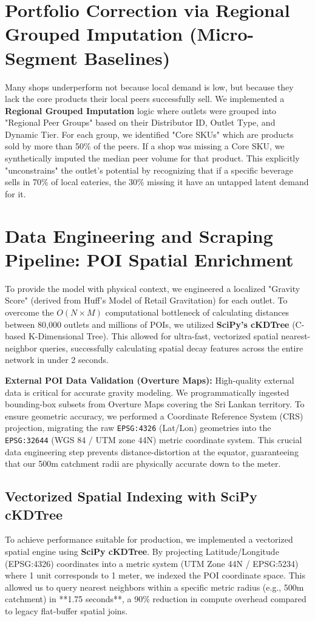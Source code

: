 \documentclass[10pt,a4paper]{article}
\begin{document}
\section{Portfolio Correction via Regional Grouped Imputation (Micro-Segment Baselines)}
Many shops underperform not because local demand is low, but because they lack the core products their local peers successfully sell. We implemented a \textbf{Regional Grouped Imputation} logic where outlets were grouped into "Regional Peer Groups" based on their Distributor ID, Outlet Type, and Dynamic Tier. For each group, we identified "Core SKUs" which are products sold by more than 50\% of the peers. If a shop was missing a Core SKU, we synthetically imputed the median peer volume for that product. This explicitly "unconstrains" the outlet's potential by recognizing that if a specific beverage sells in 70\% of local eateries, the 30\% missing it have an untapped latent demand for it.

\section{Data Engineering and Scraping Pipeline: POI Spatial Enrichment}
To provide the model with physical context, we engineered a localized "Gravity Score" (derived from Huff's Model of Retail Gravitation) for each outlet. To overcome the $O(N \times M)$ computational bottleneck of calculating distances between 80,000 outlets and millions of POIs, we utilized \textbf{SciPy's cKDTree} (C-based K-Dimensional Tree). This allowed for ultra-fast, vectorized spatial nearest-neighbor queries, successfully calculating spatial decay features across the entire network in under 2 seconds.

\textbf{External POI Data Validation (Overture Maps):} High-quality external data is critical for accurate gravity modeling. We programmatically ingested bounding-box subsets from Overture Maps covering the Sri Lankan territory. To ensure geometric accuracy, we performed a Coordinate Reference System (CRS) projection, migrating the raw \texttt{EPSG:4326} (Lat/Lon) geometries into the \texttt{EPSG:32644} (WGS 84 / UTM zone 44N) metric coordinate system. This crucial data engineering step prevents distance-distortion at the equator, guaranteeing that our 500m catchment radii are physically accurate down to the meter. 

\subsection{Vectorized Spatial Indexing with SciPy cKDTree}
To achieve performance suitable for production, we implemented a vectorized spatial engine using \textbf{SciPy cKDTree}. By projecting Latitude/Longitude (EPSG:4326) coordinates into a metric system (UTM Zone 44N / EPSG:5234) where 1 unit corresponds to 1 meter, we indexed the POI coordinate space. This allowed us to query nearest neighbors within a specific metric radius (e.g., 500m catchment) in **1.75 seconds**, a 90\% reduction in compute overhead compared to legacy flat-buffer spatial joins.
\end{document}
